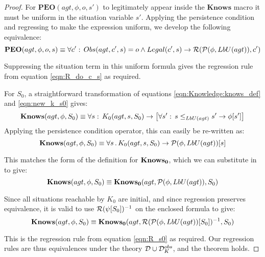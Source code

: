 \begin{proof}
For $\mathbf{PEO}(agt,\phi,o,s')$ to legitimately appear inside the
$\mathbf{Knows}$ macro it must be uniform in the situation variable
$s'$. Applying the persistence condition and regressing to make the
expression uniform, we develop the following equivalence:\[
\mathbf{PEO}(agt,\phi,o,s)\equiv\forall c':\, Obs(agt,c',s)=o\wedge Legal(c',s)\rightarrow\mathcal{R}(\mathcal{P}(\phi,LbU(agt)),c')\]


Suppressing the situation term in this uniform formula gives the regression
rule from equation \eqref{eqn:R_do_c_s} as required.

For $S_{0}$, a straightforward transformation of equations \eqref{eqn:Knowledge:knows_def}
and \eqref{eqn:new_k_s0} gives:\[
\mathbf{Knows}(agt,\phi,S_{0})\equiv\forall s:\, K_{0}(agt,s,S_{0})\rightarrow\left[\forall s':\, s\leq_{LbU(agt)}s'\rightarrow\phi[s']\right]\]
 Applying the persistence condition operator, this can easily be re-written
as:\[
\mathbf{Knows}(agt,\phi,S_{0})\equiv\forall s\,.\, K_{0}(agt,s,S_{0})\rightarrow\mathcal{P}(\phi,LbU(agt))[s]\]


This matches the form of the definition for $\mathbf{Knows_{0}}$, which we can
substitute in to give:\[
\mathbf{Knows}(agt,\phi,S_{0})\equiv\mathbf{Knows_{0}}(agt,\mathcal{P}(\phi,LbU(agt)),S_{0})\]


Since all situations reachable by $K_{0}$ are initial, and since
regression preserves equivalence, it is valid to use $\mathcal{R}(\psi[S_{0}])^{-1}$
on the enclosed formula to give:\[
\mathbf{Knows}(agt,\phi,S_{0})\equiv\mathbf{Knows_{0}}(agt,\mathcal{R}(\mathcal{P}(\phi,LbU(agt))[S_{0}])^{-1},S_{0})\]


This is the regression rule from equation \eqref{eqn:R_s0} as required.
Our regression rules are thus equivalences under the theory $\mathcal{D}\cup\mathcal{D}_{K}^{obs}$,
and the theorem holds. 
\end{proof}
\bigskip{}


